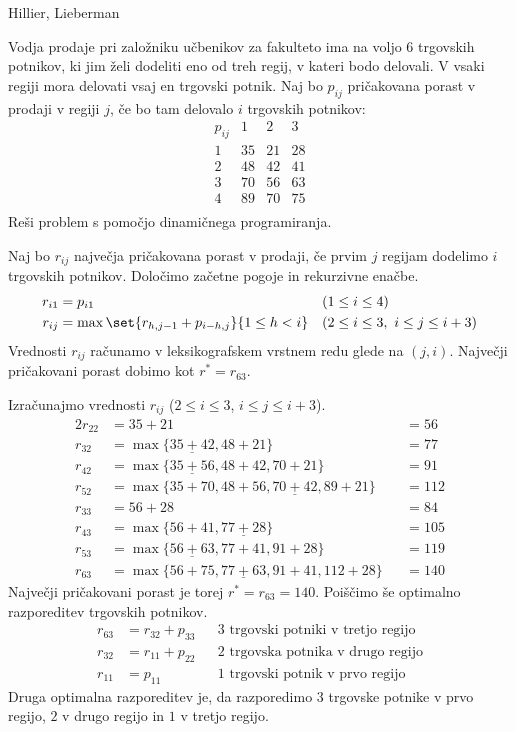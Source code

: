 \begin{naloga}{Hillier, Lieberman}{\cite[Problem~11.2-2]{hl}}
\begin{vprasanje}
Vodja prodaje pri založniku učbenikov za fakulteto
ima na voljo $6$ trgovskih potnikov,
ki jim želi dodeliti eno od treh regij, v kateri bodo delovali.
V vsaki regiji mora delovati vsaj en trgovski potnik.
Naj bo $p_{ij}$ pričakovana porast v prodaji v regiji $j$,
če bo tam delovalo $i$ trgovskih potnikov:
$$
\begin{array}{c|ccc}
p_{ij} & 1 & 2 & 3 \\
\hline
1 & 35 & 21 & 28 \\
2 & 48 & 42 & 41 \\
3 & 70 & 56 & 63 \\
4 & 89 & 70 & 75 \\
\end{array}
$$
Reši problem s pomočjo dinamičnega programiranja.
\end{vprasanje}

\begin{odgovor}
Naj bo $r_{ij}$ največja pričakovana porast v prodaji,
če prvim $j$ regijam dodelimo $i$ trgovskih potnikov.
Določimo začetne pogoje in rekurzivne enačbe.
\begin{align*}
r_{i1} &= p_{i1} && (1 \le i \le 4) \\
r_{ij} &= \max\set{r_{h,j-1} + p_{i-h,j}}{1 \le h < i}
&& (2 \le i \le 3, \ i \le j \le i+3)
\end{align*}
Vrednosti $r_{ij}$ računamo v leksikografskem vrstnem redu glede na $(j, i)$.
Največji pričakovani porast dobimo kot $r^* = r_{63}$.

Izračunajmo vrednosti $r_{ij}$ ($2 \le i \le 3$, $i \le j \le i+3$).
\begin{alignat*}{2}
r_{22} &= 35 + 21 &&= 56 \\
r_{32} &= \max\{\underline{35+42}, 48+21\} &&= 77 \\
r_{42} &= \max\{\underline{35+56}, 48+42, 70+21\} &&= 91 \\
r_{52} &= \max\{35+70, 48+56, \underline{70+42}, 89+21\} &&= 112 \\
r_{33} &= 56 + 28 &&= 84 \\
r_{43} &= \max\{56+41, \underline{77+28}\} &&= 105 \\
r_{53} &= \max\{\underline{56+63}, 77+41, 91+28\} &&= 119 \\
r_{63} &= \max\{56+75, \underline{77+63}, 91+41, 112+28\} &&= 140
\end{alignat*}
Največji pričakovani porast je torej $r^* = r_{63} = 140$.
Poiščimo še optimalno razporeditev trgovskih potnikov.
\begin{align*}
r_{63} &= r_{32} + p_{33} && \text{$3$ trgovski potniki v tretjo regijo} \\
r_{32} &= r_{11} + p_{22} && \text{$2$ trgovska potnika v drugo regijo} \\
r_{11} &= p_{11}          && \text{$1$ trgovski potnik v prvo regijo}
\end{align*}
Druga optimalna razporeditev je,
da razporedimo $3$ trgovske potnike v prvo regijo,
$2$ v drugo regijo in $1$ v tretjo regijo.
\end{odgovor}
\end{naloga}

